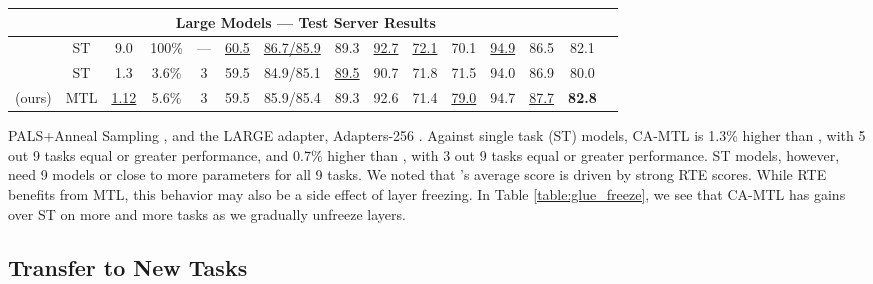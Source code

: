 \documentclass{article} \usepackage{iclr2021_conference,times}
\begin{document}
\begin{table*}[h!]
\begin{center}
\begin{tabular}{|c|c|c|c|c|ccccccccc|c}
        
        \hline
        \multicolumn{14}{|c|}{\textbf{Large Models --- Test Server Results}} \\
        \hline
        
         & ST & 9.0 & 100\% & --- & \underline{60.5} & \underline{86.7/85.9} & 89.3 & \underline{92.7} & \underline{72.1} & 70.1 & \underline{94.9} & 86.5 & 82.1 \\
        
         & ST & 1.3 & 3.6\% & 3 & 59.5 & 84.9/85.1 & \underline{89.5} & 90.7 & 71.8 & 71.5 & 94.0 & 86.9 & 80.0 \\
        
         (ours)& MTL & \underline{1.12} & 5.6\% & 3 & 59.5 & 85.9/85.4 & 89.3 & 92.6 & 71.4 & \underline{79.0} & 94.7 & \underline{87.7}  & \textbf{82.8} \\

    \hline
\end{tabular}
\end{center}
\end{table*}
 
 PALS+Anneal Sampling \citep{pmlr-v97-stickland19a}, and the LARGE adapter,
 Adapters-256 \citep{DBLP:journals/corr/abs-1902-00751}. Against single task (ST) models, CA-MTL is 1.3\% higher than , with 5 out 9 tasks equal or greater performance, and 0.7\% higher than , with 3 out 9 tasks equal or greater performance. ST models, however, need 9 models or close to  more parameters for all 9 tasks. We noted that 's average score is driven by strong RTE scores. While RTE benefits from MTL, this behavior may also be a side effect of layer freezing. In Table \ref{table:glue_freeze}, we see that CA-MTL has gains over ST on more and more tasks as we gradually unfreeze layers.




\subsection{Transfer to New Tasks}
\label{sec:new_tasks}
\end{document}
